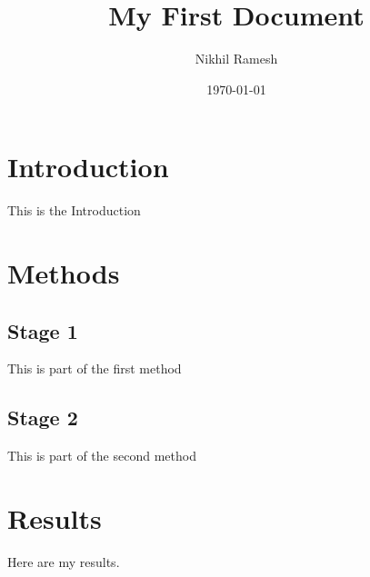 \documentclass[a4paper,12pt]{article}
\begin{document}
\title{My First Document}
\author{Nikhil Ramesh}
\date{\today}
\maketitle

\section{Introduction}
This is the Introduction 

\section{Methods}

\subsection{Stage 1}
This is part of the first method

\subsection{Stage 2}
This is part of the second method

\section{Results}
Here are my results.
\end{document}
